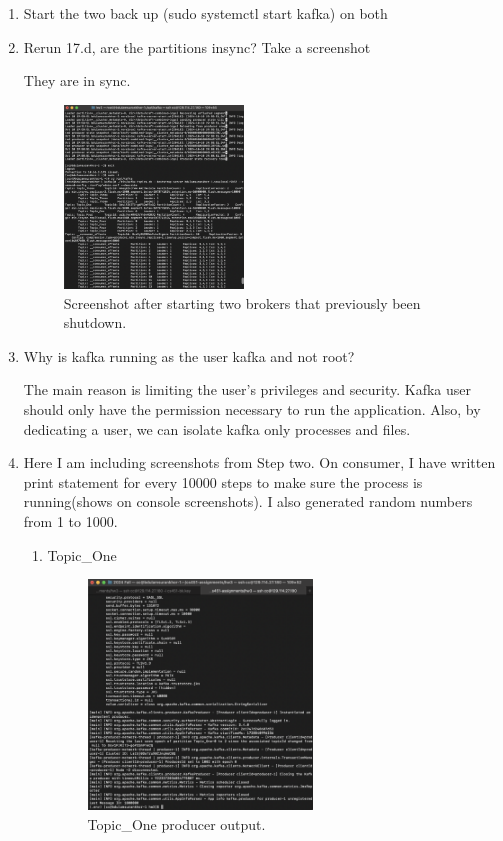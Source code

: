 \documentclass{article}
\begin{document}
\begin{enumerate}
  \item Start the two back up (sudo systemctl start kafka) on both
  \item Rerun 17.d, are the partitions insync? Take a screenshot

  They are in sync.

  \begin{figure}[H]
    \centering
    \includegraphics[width=0.45\textwidth]{image9.png}
    \caption{Screenshot after starting two brokers that previously been shutdown.}
  \end{figure}

  \item Why is kafka running as the user kafka and not root?

  The main reason is limiting the user's privileges and security.
  Kafka user should only have the permission necessary to run the application.
  Also, by dedicating a user, we can isolate kafka only processes and files.

  \vspace{1cm}

  \item Here I am including screenshots from Step two.
  On consumer, I have written print statement for every 10000 steps to make sure the process is running(shows on console screenshots).
  I also generated random numbers from 1 to 1000.

  \begin{enumerate}
    \item Topic\_One
    \begin{figure}[H]
      \centering
      \includegraphics[width=0.6\textwidth]{image10.png}
      \caption{Topic\_One producer output.}
    \end{figure}


\end{enumerate}
\end{enumerate}
\end{document}
